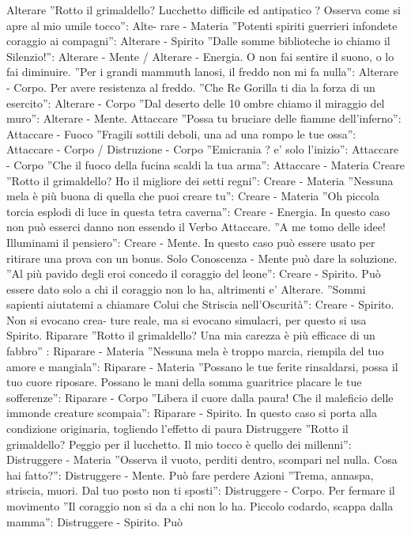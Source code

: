 \documentclass[12pt,a4paper,twoside,openany]{book}
\begin{document}
Alterare
”Rotto il grimaldello? Lucchetto difficile ed antipatico ? Osserva come si apre al mio umile tocco”: Alte-
rare - Materia
”Potenti spiriti guerrieri infondete coraggio ai compagni”: Alterare - Spirito
”Dalle somme biblioteche io chiamo il Silenzio!”: Alterare - Mente / Alterare - Energia. O non fai sentire il
suono, o lo fai diminuire.
”Per i grandi mammuth lanosi, il freddo non mi fa nulla”: Alterare - Corpo. Per avere resistenza al freddo.
”Che Re Gorilla ti dia la forza di un esercito”: Alterare - Corpo
”Dal deserto delle 10 ombre chiamo il miraggio del muro”: Alterare - Mente.
Attaccare
”Possa tu bruciare delle fiamme dell’inferno”: Attaccare - Fuoco
”Fragili sottili deboli, una ad una rompo le tue ossa”: Attaccare - Corpo / Distruzione - Corpo
”Emicrania ? e’ solo l’inizio”: Attaccare - Corpo
”Che il fuoco della fucina scaldi la tua arma”: Attaccare - Materia
Creare
”Rotto il grimaldello? Ho il migliore dei setti regni”: Creare - Materia
”Nessuna mela è più buona di quella che puoi creare tu”: Creare - Materia
”Oh piccola torcia esplodi di luce in questa tetra caverna”: Creare - Energia. In questo caso non può esserci
danno non essendo il Verbo Attaccare.
”A me tomo delle idee! Illuminami il pensiero”: Creare - Mente. In questo caso può essere usato per ritirare
una prova con un bonus. Solo Conoscenza - Mente può dare la soluzione.
”Al più pavido degli eroi concedo il coraggio del leone”: Creare - Spirito. Può essere dato solo a chi il coraggio
non lo ha, altrimenti e’ Alterare.
”Sommi sapienti aiutatemi a chiamare Colui che Striscia nell’Oscurità”: Creare - Spirito. Non si evocano crea-
ture reale, ma si evocano simulacri, per questo si usa Spirito.
Riparare
”Rotto il grimaldello? Una mia carezza è più efficace di un fabbro” : Riparare - Materia
”Nessuna mela è troppo marcia, riempila del tuo amore e mangiala”: Riparare - Materia
”Possano le tue ferite rinsaldarsi, possa il tuo cuore riposare. Possano le mani della somma guaritrice placare
le tue sofferenze”: Riparare - Corpo
”Libera il cuore dalla paura! Che il maleficio delle immonde creature scompaia”: Riparare - Spirito. In questo
caso si porta alla condizione originaria, togliendo l’effetto di paura
Distruggere
”Rotto il grimaldello? Peggio per il lucchetto. Il mio tocco è quello dei millenni”: Distruggere - Materia
”Osserva il vuoto, perditi dentro, scompari nel nulla. Cosa hai fatto?”: Distruggere - Mente. Può fare perdere
Azioni
”Trema, annaspa, striscia, muori. Dal tuo posto non ti sposti”: Distruggere - Corpo. Per fermare il movimento
”Il coraggio non si da a chi non lo ha. Piccolo codardo, scappa dalla mamma”: Distruggere - Spirito. Può
\end{document}
